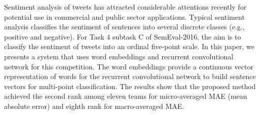 Sentiment analysis of tweets has attracted considerable attentions recently for potential use in commercial and public sector applications. Typical sentiment analysis classifies the sentiment of sentences into several discrete classes (e.g., positive and negative). For Task 4 subtask C of SemEval-2016, the aim is to classify the sentiment of tweets into an ordinal five-point scale. In this paper, we presents a system that uses word embeddings and recurrent convolutional network for this competition. The word embeddings provide a continuous vector representation of words for the recurrent convolutional network to build sentence vectors for multi-point classification. The results show that the proposed method achieved the second rank among eleven teams for micro-averaged MAE (mean absolute error) and eighth rank for macro-averaged MAE.
